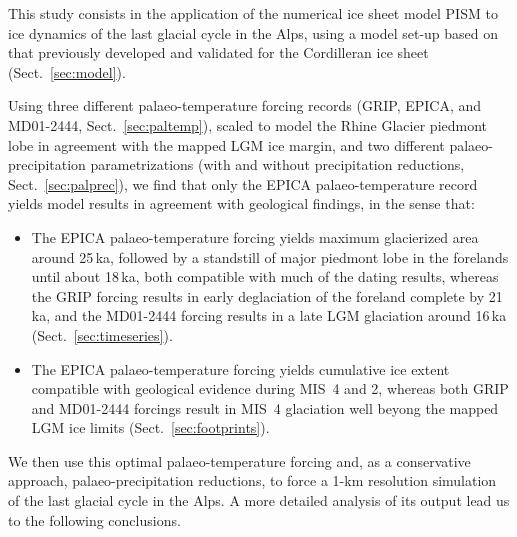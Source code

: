 \documentclass[tc, manuscript]{copernicus}
\begin{document}
\conclusions

    This study consists in the application of the numerical ice sheet model
    PISM to ice dynamics of the last glacial cycle in the Alps, using a model
    set-up based on that previously developed and validated for the Cordilleran
    ice sheet (Sect.~\ref{sec:model}).

    Using three different palaeo-temperature forcing records (GRIP, EPICA, and
    MD01-2444, Sect.~\ref{sec:paltemp}), scaled to model the Rhine Glacier
    piedmont lobe in agreement with the mapped LGM ice margin, and two
    different palaeo-precipitation parametrizations (with and without
    precipitation reductions, Sect.~\ref{sec:palprec}), we find that only the
    EPICA palaeo-temperature record yields model results in agreement with
    geological findings, in the sense that:

    \begin{itemize}
      \item The EPICA palaeo-temperature forcing yields maximum glacierized
            area around 25\,ka, followed by a standstill of major piedmont lobe
            in the forelands until about 18\,ka, both compatible with much of
            the dating results, whereas the GRIP forcing results in early
            deglaciation of the foreland complete by 21\,ka, and the MD01-2444
            forcing results in a late LGM glaciation around 16\,ka
            (Sect.~\ref{sec:timeseries}).
      \item The EPICA palaeo-temperature forcing yields cumulative ice extent
            compatible with geological evidence during MIS~4 and 2, whereas
            both GRIP and MD01-2444 forcings result in MIS~4 glaciation well
            beyong the mapped LGM ice limits  (Sect.~\ref{sec:footprints}).
    \end{itemize}

    We then use this optimal palaeo-temperature forcing and, as a conservative
    approach, palaeo-precipitation reductions, to force a 1-km resolution
    simulation of the last glacial cycle in the Alps. A more detailed analysis
    of its output lead us to the following conclusions.
\end{document}
